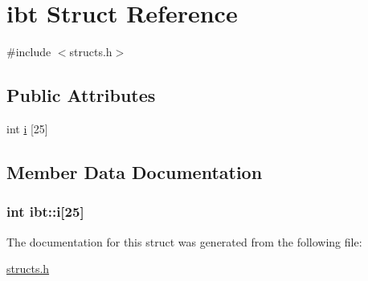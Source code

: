 \hypertarget{structibt}{\section{ibt Struct Reference}
\label{structibt}
}


{\ttfamily \#include $<$structs.\-h$>$}

\subsection*{Public Attributes}
\begin{DoxyCompactItemize}
\item 
int \hyperlink{structibt_a32818b983a09bcb424dc4bff414b2b48}{i} \mbox{[}25\mbox{]}
\end{DoxyCompactItemize}


\subsection{Member Data Documentation}
\hypertarget{structibt_a32818b983a09bcb424dc4bff414b2b48}{
\subsubsection[{i}]{\setlength{\rightskip}{0pt plus 5cm}int ibt\-::i\mbox{[}25\mbox{]}}}\label{structibt_a32818b983a09bcb424dc4bff414b2b48}


The documentation for this struct was generated from the following file\-:\begin{DoxyCompactItemize}
\item 
\hyperlink{structs_8h}{structs.\-h}\end{DoxyCompactItemize}
